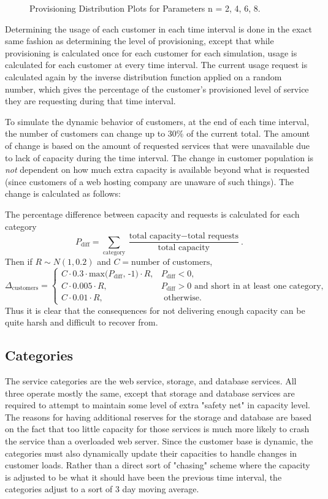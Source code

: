 \documentclass[12pt]{article} %
\begin{document}
\begin{figure}[h!]
        \caption{Provisioning Distribution Plots for Parameters n = 2, 4, 6, 8.}
        \label{fig:Provisioning}
    \end{figure}

    Determining the usage of each customer in each time interval is done in the exact same fashion as determining the level of provisioning, except that while provisioning is calculated once for each customer for each simulation, usage is calculated for each customer at every time interval.  
    The current usage request is calculated again by the inverse distribution function applied on a random number, which gives the percentage of the customer's provisioned level of service they are requesting during that time interval.

    To simulate the dynamic behavior of customers, at the end of each time interval, the number of customers can change up to 30\% of the current total.  The amount of change is based on the amount of requested services that were unavailable due to lack of capacity during the time interval.  
    The change in customer population is \emph{not} dependent on how much extra capacity is available beyond what is requested (since customers of a web hosting company are unaware of such things).
    The change is calculated as follows:

    The percentage difference between capacity and requests is calculated for each category
    \[
P_{\text{diff}} = \sum_{\text{category}}\frac{\text{total capacity} - \text{total requests}}{\text{total capacity}}.\]
Then if \(R\sim N(1,0.2)\) and \(C = \text{number of customers}\), 
    \[
\Delta_{\text{customers}} = \begin{cases}
    C\cdot 0.3 \cdot \text{max(}P_{\text{diff}}\text{, -1})\cdot R, & P_{\text{diff}} < 0,\\
                          C\cdot 0.005 \cdot R, & P_{\text{diff}} > 0\text{ and short in at least one category},\\
                           C\cdot 0.01 \cdot R, &\text{ otherwise.}
\end{cases}
    \]
    Thus it is clear that the consequences for not delivering enough capacity can be quite harsh and difficult to recover from.

    \subsection{Categories}
    The service categories are the web service, storage, and database services.  
    All three operate mostly the same, except that storage and database services are required to attempt to maintain some level of extra "safety net" in capacity level.
    The reasons for having additional reserves for the storage and database are based on the fact that too little capacity for those services is much more likely to crash the service than a overloaded web server.  Since the customer base is dynamic, the categories must also dynamically update their capacities to handle changes in customer loads.  Rather than a direct sort of "chasing" scheme where the capacity is adjusted to be what it should have been the previous time interval, the categories adjust to a sort of 3 day moving average.
\end{document}
